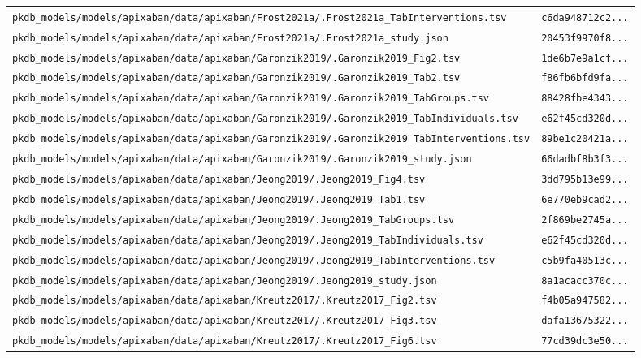 \documentclass{article}
\begin{document}
\begin{longtable}{ll}
\texttt{pkdb\_models/models/apixaban/data/apixaban/Frost2021a/.Frost2021a\_TabInterventions.tsv} & \texttt{c6da948712c2...} \\
\texttt{pkdb\_models/models/apixaban/data/apixaban/Frost2021a/.Frost2021a\_study.json} & \texttt{20453f9970f8...} \\
\texttt{pkdb\_models/models/apixaban/data/apixaban/Garonzik2019/.Garonzik2019\_Fig2.tsv} & \texttt{1de6b7e9a1cf...} \\
\texttt{pkdb\_models/models/apixaban/data/apixaban/Garonzik2019/.Garonzik2019\_Tab2.tsv} & \texttt{f86fb6bfd9fa...} \\
\texttt{pkdb\_models/models/apixaban/data/apixaban/Garonzik2019/.Garonzik2019\_TabGroups.tsv} & \texttt{88428fbe4343...} \\
\texttt{pkdb\_models/models/apixaban/data/apixaban/Garonzik2019/.Garonzik2019\_TabIndividuals.tsv} & \texttt{e62f45cd320d...} \\
\texttt{pkdb\_models/models/apixaban/data/apixaban/Garonzik2019/.Garonzik2019\_TabInterventions.tsv} & \texttt{89be1c20421a...} \\
\texttt{pkdb\_models/models/apixaban/data/apixaban/Garonzik2019/.Garonzik2019\_study.json} & \texttt{66dadbf8b3f3...} \\
\texttt{pkdb\_models/models/apixaban/data/apixaban/Jeong2019/.Jeong2019\_Fig4.tsv} & \texttt{3dd795b13e99...} \\
\texttt{pkdb\_models/models/apixaban/data/apixaban/Jeong2019/.Jeong2019\_Tab1.tsv} & \texttt{6e770eb9cad2...} \\
\texttt{pkdb\_models/models/apixaban/data/apixaban/Jeong2019/.Jeong2019\_TabGroups.tsv} & \texttt{2f869be2745a...} \\
\texttt{pkdb\_models/models/apixaban/data/apixaban/Jeong2019/.Jeong2019\_TabIndividuals.tsv} & \texttt{e62f45cd320d...} \\
\texttt{pkdb\_models/models/apixaban/data/apixaban/Jeong2019/.Jeong2019\_TabInterventions.tsv} & \texttt{c5b9fa40513c...} \\
\texttt{pkdb\_models/models/apixaban/data/apixaban/Jeong2019/.Jeong2019\_study.json} & \texttt{8a1acacc370c...} \\
\texttt{pkdb\_models/models/apixaban/data/apixaban/Kreutz2017/.Kreutz2017\_Fig2.tsv} & \texttt{f4b05a947582...} \\
\texttt{pkdb\_models/models/apixaban/data/apixaban/Kreutz2017/.Kreutz2017\_Fig3.tsv} & \texttt{dafa13675322...} \\
\texttt{pkdb\_models/models/apixaban/data/apixaban/Kreutz2017/.Kreutz2017\_Fig6.tsv} & \texttt{77cd39dc3e50...} \\

\end{longtable}
\end{document}
